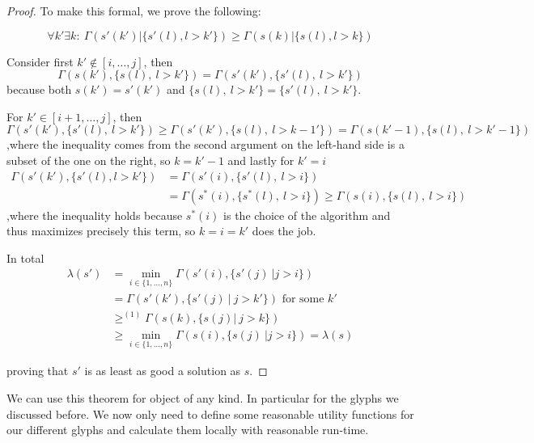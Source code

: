 \documentclass[a4paper,11pt]{article}
\begin{document}
\begin{proof}
To make this formal, we prove the following: 

\begin{equation}
    \forall k' \exists k:\ \Gamma(s'(k')|\{s'(l), l>k'\})\geq\Gamma(s(k)|\{s(l), l>k\})
\end{equation}

Consider first $k'\notin [i,\dots,j]$, then
\[\Gamma(s(k'),\{s(l),\ l>k'\}) = \Gamma(s'(k'),\{s'(l),\ l>k'\})\]
because both $s(k')=s'(k')$ and $\{s(l),\ l>k'\}=\{s'(l),\ l>k'\}$.

For $k'\in [i+1,\dots,j]$, then
\[ \Gamma(s'(k'),\{s'(l),\ l>k'\}) \geq \Gamma(s'(k'),\{s(l),\ l>k-1'\}) = \Gamma(s(k'-1),\{s(l),\ l>k'-1\})\]
,where the inequality comes from the second argument on the left-hand side is a subset of the one on the right, so $k=k'-1$ and lastly for $k'=i$
\begin{equation*}
\begin{split}
\Gamma(s'(k'),\{s'(l), l>k'\}) &= \Gamma(s'(i),\{s'(l),\ l>i\})\\
&=\Gamma(s^*(i),\{s^*(l),\ l>i\})\geq\Gamma(s(i),\{s(l),\ l>i\})
\end{split}
\end{equation*}
,where the inequality holds because $s^*(i)$ is the choice of the algorithm and thus maximizes precisely this term, so $k=i=k'$ does the job.

In total 
\begin{equation*}
\begin{split}
    \lambda(s') &=  \min_{i \in \{1,\dots,n\}} \Gamma(s'(i), \{s'(j)\ | j > i\})\\
    &= \Gamma(s'(k'), \{s'(j)\ |\ j > k'\}) \text{ for some }k'\\
    &\geq^{(1)} \Gamma(s(k), \{s(j)|\ j>k \})\\
    &\geq \min_{i \in \{1,\dots,n\}} \Gamma(s(i), \{s(j)\ | j > i\}) = \lambda(s)
\end{split}
\end{equation*}

proving that $s'$ is as least as good a solution as $s$.
\end{proof}

We can use this theorem for object of any kind. In particular for the glyphs we discussed before. We now only need to define some reasonable utility functions for our different glyphs and calculate them locally with reasonable run-time.
\end{document}
